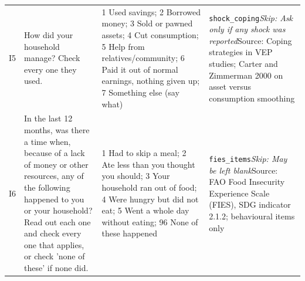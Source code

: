 \documentclass[10pt]{article}
\begin{document}
{\begin{longtable}{p{0.8cm}p{6.4cm}p{3.6cm}p{5.8cm}}
I5 & How did your household manage? Check every one they used. & 1 Used savings; 2 Borrowed money; 3 Sold or pawned assets; 4 Cut consumption; 5 Help from relatives/community; 6 Paid it out of normal earnings, nothing given up; 7 Something else (say what) & \texttt{shock\_coping}\newline \textit{Skip: Ask only if any shock was reported}\newline Source: Coping strategies in VEP studies; Carter and Zimmerman 2000 on asset versus consumption smoothing \\
I6 & In the last 12 months, was there a time when, because of a lack of money or other resources, any of the following happened to you or your household? Read out each one and check every one that applies, or check 'none of these' if none did. & 1 Had to skip a meal; 2 Ate less than you thought you should; 3 Your household ran out of food; 4 Were hungry but did not eat; 5 Went a whole day without eating; 96 None of these happened & \texttt{fies\_items}\newline \textit{Skip: May be left blank}\newline Source: FAO Food Insecurity Experience Scale (FIES), SDG indicator 2.1.2; behavioural items only \\
\bottomrule
\end{longtable}
}
\end{document}
